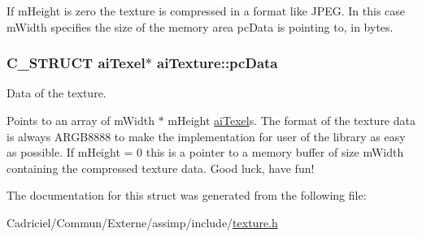 If m\+Height is zero the texture is compressed in a format like J\+P\+EG. In this case m\+Width specifies the size of the memory area pc\+Data is pointing to, in bytes. 
\subsubsection[{\texorpdfstring{pc\+Data}{pcData}}]{\setlength{\rightskip}{0pt plus 5cm}C\+\_\+\+S\+T\+R\+U\+CT {\bf ai\+Texel}$\ast$ ai\+Texture\+::pc\+Data}\hypertarget{structai_texture_aeb07528748b6e49d2d81c60006024f9a}{}\label{structai_texture_aeb07528748b6e49d2d81c60006024f9a}
Data of the texture.

Points to an array of m\+Width $\ast$ m\+Height \hyperlink{structai_texel}{ai\+Texel}\textquotesingle{}s. The format of the texture data is always A\+R\+G\+B8888 to make the implementation for user of the library as easy as possible. If m\+Height = 0 this is a pointer to a memory buffer of size m\+Width containing the compressed texture data. Good luck, have fun! 

The documentation for this struct was generated from the following file\+:\begin{DoxyCompactItemize}
\item 
Cadriciel/\+Commun/\+Externe/assimp/include/\hyperlink{texture_8h}{texture.\+h}\end{DoxyCompactItemize}

